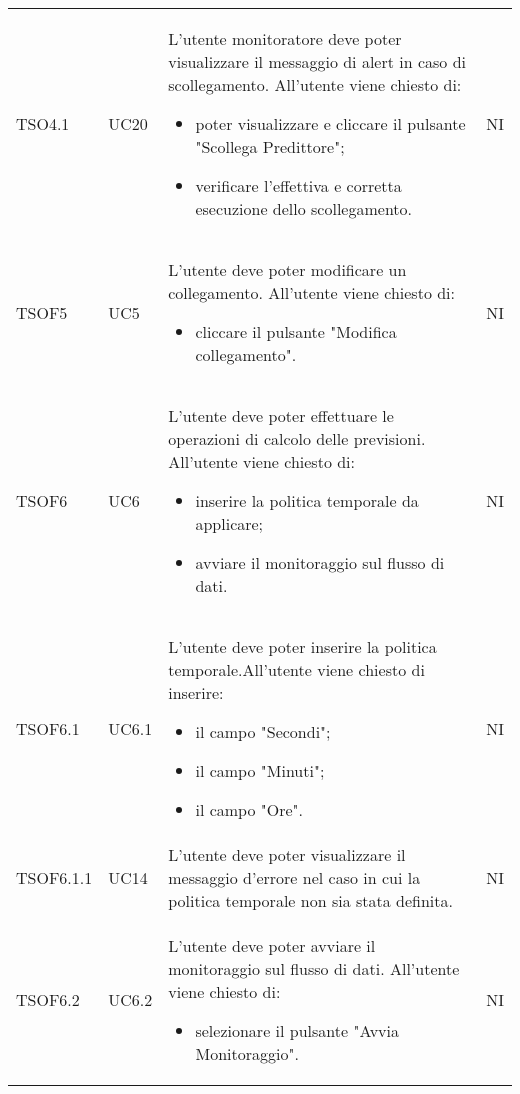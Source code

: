 \begin{longtable}{C{2.5cm} C{2.5cm} L{8cm} C{2cm}}
TSO4.1 &
UC20 &
L'utente monitoratore deve poter visualizzare il messaggio di alert in caso di scollegamento. All'utente viene chiesto di:
\begin{itemize}
	\item poter visualizzare e cliccare il pulsante "Scollega Predittore";
	\item verificare l'effettiva e corretta esecuzione dello scollegamento.
\end{itemize}&
NI \\


TSOF5 & UC5 & L'utente deve poter modificare un collegamento. \newline All'utente viene chiesto di: \begin{itemize}
\item cliccare il pulsante "Modifica collegamento".
\end{itemize} & NI \\
TSOF6 & UC6 & L'utente deve poter effettuare le operazioni di calcolo delle previsioni. \newline
All'utente viene chiesto di: \begin{itemize}
\item inserire la politica temporale da applicare;
\item avviare il monitoraggio sul flusso di dati.
\end{itemize}& NI \\
TSOF6.1 & UC6.1 & L'utente deve poter inserire la politica temporale.\newline All'utente viene chiesto di inserire: \begin{itemize}
\item il campo "Secondi";
\item il campo "Minuti";
\item il campo "Ore".
\end{itemize} & NI \\
TSOF6.1.1 & UC14 & L'utente deve poter visualizzare il messaggio d’errore nel caso in cui la politica temporale non sia stata definita. & NI \\
TSOF6.2 & UC6.2 & L'utente deve poter avviare il monitoraggio sul flusso di dati. \newline All'utente viene chiesto di: \begin{itemize}
\item selezionare il pulsante "Avvia Monitoraggio".
\end{itemize} & NI \\

\end{longtable}
